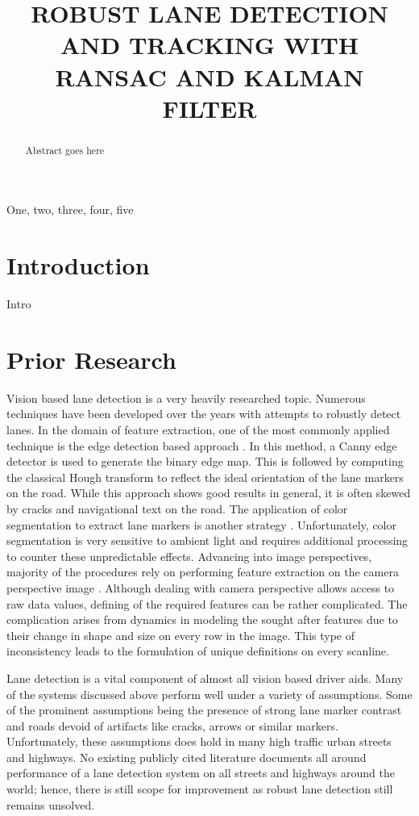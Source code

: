 \documentclass{article}
\title{ROBUST LANE DETECTION AND TRACKING WITH RANSAC AND KALMAN FILTER}
\begin{document}
%
\maketitle
%
\begin{abstract}
Abstract goes here
\end{abstract}
%
\begin{keywords}
One, two, three, four, five
\end{keywords}
%
\section{Introduction}
\label{sec:intro}
Intro

\section{Prior Research}
\label{sec:prior}
Vision based lane detection is a very heavily researched topic. Numerous techniques have been developed over the years with attempts to robustly detect lanes. In the domain of feature extraction, one of the most commonly applied technique is the edge detection based approach \cite{assidiq_real_2008,wang_driver_2005}. In this method, a Canny edge detector is used to generate the binary edge map. This is followed by computing the classical Hough transform to reflect the ideal orientation of the lane markers on the road. While this approach shows good results in general, it is often skewed by cracks and navigational text on the road. The application of color segmentation to extract lane markers is another strategy \cite{sun_hsi_2006,chin_lane_2005}. Unfortunately, color segmentation is very sensitive to ambient light and requires additional processing to counter these unpredictable effects. Advancing into image perspectives, majority of the procedures rely on performing feature extraction on the camera perspective image \cite{borkar_layered_2009,assidiq_real_2008,sun_hsi_2006,wang_real-time_2006}. Although dealing with camera perspective allows access to raw data values, defining of the required features can be rather complicated. The complication arises from dynamics in modeling the sought after features due to their change in shape and size on every row in the image. This type of inconsistency leads to the formulation of unique definitions on every scanline.

Lane detection is a vital component of almost all vision based driver aids. Many of the systems discussed above perform well under a variety of assumptions. Some of the prominent assumptions being the presence of strong lane marker contrast and roads devoid of artifacts like cracks, arrows or similar markers. Unfortunately, these assumptions does hold in many high traffic urban streets and highways. No existing publicly cited literature documents all around performance of a lane detection system on all streets and highways around the world; hence, there is still scope for improvement as robust lane detection still remains unsolved.
\end{document}

